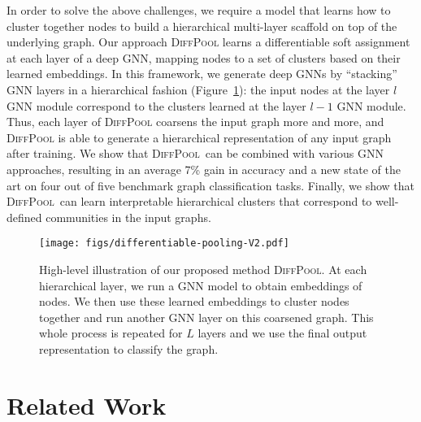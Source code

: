 \documentclass{article}
\newcommand{\jure}[1]{{{\textcolor{red}{[Jure: #1]}}}}
\newcommand{\chris}[1]{{{\textcolor{orange}{[Christopher: #1]}}}}
\newcommand{\will}[1]{{{\textcolor{purple}{[Will: #1]}}}}
\newcommand{\name}{\textsc{DiffPool}\xspace}
\newcommand{\cut}[1]{}
\begin{document}
In order to solve the above challenges, we require a model that learns how to cluster together nodes to build a hierarchical multi-layer scaffold on top of the underlying graph. 
Our approach \name learns a differentiable soft assignment at each layer of a deep GNN, mapping nodes to a set of clusters based on their learned embeddings. 
In this framework, we generate deep GNNs by ``stacking'' GNN layers in a hierarchical fashion (Figure~\ref{fig:illustration}): the input nodes at the layer $l$ GNN module correspond to the clusters learned at the layer $l-1$ GNN module. 
Thus, each layer of \name coarsens the input graph more and more, and \name is able to generate a hierarchical representation of any input graph after training.
We show that \name\ can be combined with various GNN approaches, resulting in an average 7\% gain in accuracy and a new state of the art on four out of five benchmark graph classification tasks. 
Finally,  we show that \name\ can learn interpretable hierarchical clusters that correspond to well-defined communities in the input graphs.
\cut{
\jure{Say much much more about our method, how it works and why it is cool.}

\chris{Maybe add highlevel visualization of the idea.}

\jure{ I strongly agree, we need a Figure 1 with an illustration of the method.
For example, a graph and then a hierarchical multi-layer scaffold on top of it.
Will, you are great at creating good figures. Do you want to give it a try?}
\will{Yes, I will brainstorm with Rex today about a figure and put something together :)}

\chris{Quickly sketched this. I think it somehow explains the high-level idea. Guess the equations are too much.}
}

\begin{figure}[t]\begin{center}
    \texttt{[image: figs/differentiable-pooling-V2.pdf]}
    \caption{High-level illustration of our proposed method \name. At each hierarchical layer, we run a GNN model to obtain embeddings of nodes. We then use these learned embeddings to cluster nodes together  and run another GNN layer on this coarsened graph. This whole process is repeated for $L$ layers and we use the final output representation to classify the graph. }
    \label{fig:illustration}
    \end{center}
\end{figure}



 \section{Related Work}
\end{document}
